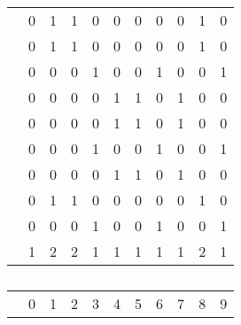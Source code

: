 \documentclass[conference]{IEEEtran}
\begin{document}
\begin{table*}
\begin{subtable}[b]{0.45\linewidth}
\begin{tabular}{c|c|c|c|c|c|c|c|c|c|c|}
	{\color{red} } & {\color{red} 0} & {\color{red} 1} & {\color{red} 1} & {\color{red} 0} & {\color{red} 0} & {\color{red} 0} & {\color{red} 0} & {\color{red} 0} & {\color{red} 1} & {\color{red} 0} \\ \cline{2-11}
	{\color{red} } & {\color{red} 0} & {\color{red} 1} & {\color{red} 1} & {\color{red} 0} & {\color{red} 0} & {\color{red} 0} & {\color{red} 0} & {\color{red} 0} & {\color{red} 1} & {\color{red} 0} \\ \cline{2-11}
	 & 0 & 0 & 0 & 1 & 0 & 0 & 1 & 0 & 0 & 1 \\ \cline{2-11}
	 & 0 & 0 & 0 & 0 & 1 & 1 & 0 & 1 & 0 & 0 \\ \cline{2-11}
	{\color{red} } & {\color{red} 0} & {\color{red} 0} & {\color{red} 0} & {\color{red} 0} & {\color{red} 1} & {\color{red} 1} & {\color{red} 0} & {\color{red} 1} & {\color{red} 0} & {\color{red} 0} \\ \cline{2-11}
	{\color{red} } & {\color{red} 0} & {\color{red} 0} & {\color{red} 0} & {\color{red} 1} & {\color{red} 0} & {\color{red} 0} & {\color{red} 1} & {\color{red} 0} & {\color{red} 0} & {\color{red} 1} \\ \cline{2-11}
	 & 0 & 0 & 0 & 0 & 1 & 1 & 0 & 1 & 0 & 0 \\ \cline{2-11}
	 & 0 & 1 & 1 & 0 & 0 & 0 & 0 & 0 & 1 & 0 \\ \cline{2-11}
	 & 0 & 0 & 0 & 1 & 0 & 0 & 1 & 0 & 0 & 1 \\ \cline{2-11}
	\multicolumn{1}{c}{} & \multicolumn{1}{c}{{\color{blue}1}} & \multicolumn{1}{c}{{\color{blue}2}} & \multicolumn{1}{c}{{\color{blue}2}} & \multicolumn{1}{c}{{\color{blue}1}} & \multicolumn{1}{c}{{\color{blue}1}} & \multicolumn{1}{c}{{\color{blue}1}} & \multicolumn{1}{c}{{\color{blue}1}} & \multicolumn{1}{c}{{\color{blue}1}} & \multicolumn{1}{c}{{\color{blue}2}} & \multicolumn{1}{c}{{\color{blue}1}} \\
	\end{tabular}	
	\caption{}
	\label{table:mat2}
\end{subtable}
\hspace{2em}
\begin{subtable}[b]{0.45\linewidth}
	\begin{tabular}{c|c|c|c|c|c|c|c|c|c|c|}
	\multicolumn{1}{c}{}  &  \multicolumn{1}{c}{0} & \multicolumn{1}{c}{1} & 
	\multicolumn{1}{c}{2} &  \multicolumn{1}{c}{3} & \multicolumn{1}{c}{4} & 
	\multicolumn{1}{c}{5} &  \multicolumn{1}{c}{6} & \multicolumn{1}{c}{7} & 
	\multicolumn{1}{c}{8} &  \multicolumn{1}{c}{9} \\ \cline{2-11}

\end{tabular}
\end{subtable}
\end{table*}
\end{document}
